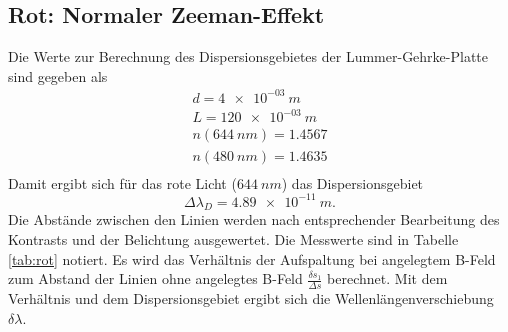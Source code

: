 \subsection{Rot: Normaler Zeeman-Effekt}
Die Werte zur Berechnung des Dispersionsgebietes der Lummer-Gehrke-Platte sind gegeben als
\begin{align*}
d         = \SI{4 e-03}{m}    \\
L         = \SI{120 e-03}{m}    \\
n(\SI{644}{nm})  = 1.4567    \\
n(\SI{480}{nm})  = 1.4635    \\
\end{align*}
Damit ergibt sich für das rote Licht ($\SI{644}{nm}$) das Dispersionsgebiet
\begin{equation*}
  \Delta \lambda_D = \SI{4.89e-11}{m}.
\end{equation*}
Die Abstände zwischen den Linien werden nach entsprechender Bearbeitung des Kontrasts und der Belichtung ausgewertet.
Die Messwerte sind in Tabelle \ref{tab:rot} notiert.
Es wird das Verhältnis der Aufspaltung bei angelegtem B-Feld zum Abstand der Linien ohne angelegtes B-Feld $\frac{\delta s_{1}}{\Delta s}$ berechnet.
Mit dem Verhältnis und dem Dispersionsgebiet ergibt sich die Wellenlängenverschiebung $\delta \lambda$.
%
%
